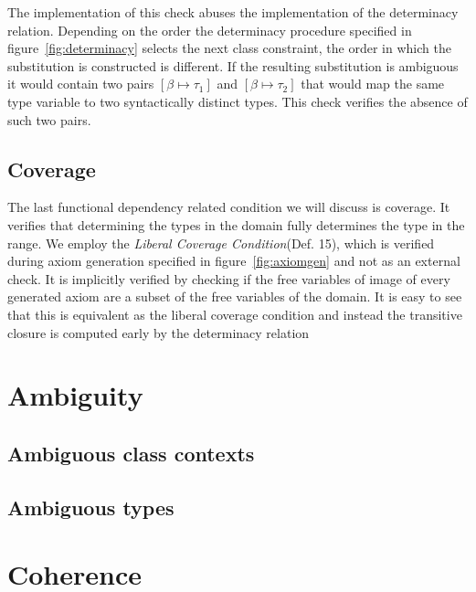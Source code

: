 The implementation of this check abuses the implementation of the determinacy
relation. Depending on the order the determinacy procedure specified in
figure~\ref{fig:determinacy} selects the next class constraint, the order in
which the substitution is constructed is different. If the resulting
substitution is ambiguous it would contain two pairs $[\beta \mapsto \tau_1]$
and $[\beta \mapsto \tau_2]$ that would map the same type variable to two
syntactically distinct types. This check verifies the absence of such two pairs.

\subsection{Coverage}

The last functional dependency related condition we will discuss is coverage.
It verifies that determining the types in the domain fully determines the type
in the range. We employ the \textit{Liberal Coverage Condition}(Def.
15\cite{fundeps-chrs}), which is verified during axiom generation specified in
figure~\ref{fig:axiomgen} and not as an external check. It is implicitly
verified by checking if the free variables of image of every generated axiom are
a subset of the free variables of the domain. It is easy to see that this is
equivalent as the liberal coverage condition and instead the transitive closure
is computed early by the determinacy relation


\section{Ambiguity}

\subsection{Ambiguous class contexts}

\subsection{Ambiguous types}

\section{Coherence}
